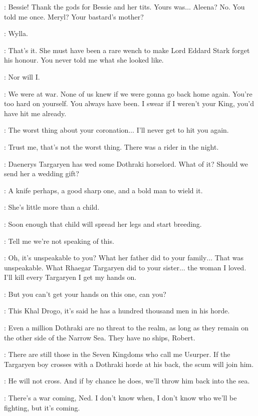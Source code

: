 \ROBERT: Bessie! Thank the gods for Bessie and her tits. Yours was$\ldots$ Aleena? No. You told me once. Meryl? Your bastard's mother? 

\NED: Wylla. 

\ROBERT: That's it. She must have been a rare wench to make Lord Eddard Stark forget his honour. You never told me what she looked like. 

\NED: Nor will I. 

\ROBERT: We were at war. None of us knew if we were gonna go back home again. You're too hard on yourself. You always have been. I swear if I weren't your King, you'd have hit me already. 

\NED: The worst thing about your coronation$\ldots$ I'll never get to hit you again. 

\ROBERT: Trust me, that's not the worst thing. There was a rider in the night. 

\NED: Daenerys Targaryen has wed some Dothraki horselord. What of it? Should we send her a wedding gift? 

\ROBERT: A knife perhaps, a good sharp one, and a bold man to wield it. 

\NED: She's little more than a child. 

\ROBERT: Soon enough that child will spread her legs and start breeding. 

\NED: Tell me we're not speaking of this. 

\ROBERT: Oh, it's unspeakable to you? What her father did to your family$\ldots$ That was unspeakable. What Rhaegar Targaryen did to your sister$\ldots$ the woman I loved. I'll kill every Targaryen I get my hands on. 

\NED: But you can't get your hands on this one, can you? 

\ROBERT: This Khal Drogo, it's said he has a hundred thousand men in his horde. 

\NED: Even a million Dothraki are no threat to the realm, as long as they remain on the other side of the Narrow Sea. They have no ships, Robert. 

\ROBERT: There are still those in the Seven Kingdoms who call me Usurper. If the Targaryen boy crosses with a Dothraki horde at his back, the scum will join him. 

\NED: He will not cross. And if by chance he does, we'll throw him back into the sea. 

\ROBERT: There's a war coming, Ned. I don't know when, I don't know who we'll be fighting, but it's coming. 

